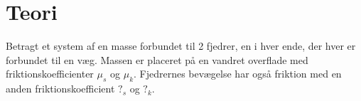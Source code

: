 \chapter{Teori}
Betragt et system af en masse forbundet til 2 fjedrer, en i hver ende, der hver er forbundet til en væg. 
Massen er placeret på en vandret overflade med friktionskoefficienter $\mu_s$ og $\mu_k$. 
Fjedrernes bevægelse har også friktion med en anden friktionskoefficient $?_s$ og $?_k$.
